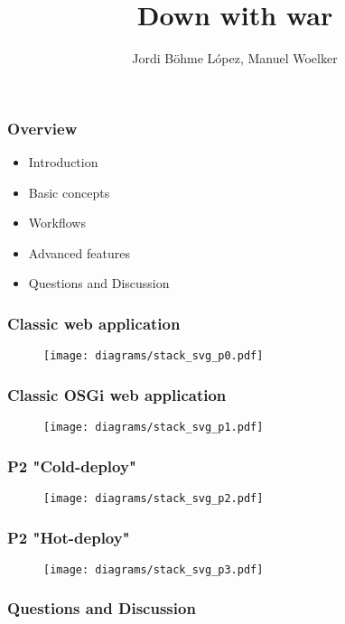 \documentclass{beamer}
\author[Jordi Böhme López]{Jordi Böhme López, Manuel Woelker}
\title[git intro\hspace{2em}\insertframenumber/\inserttotalframenumber]{Down with war}
\begin{document}
\maketitle


\begin{frame}
  \frametitle{Overview}
  \begin{itemize}
  \item Introduction\pause
  \item Basic concepts\pause
  \item Workflows\pause
  \item Advanced features\pause
  \item Questions and Discussion
  \end{itemize}
\end{frame}


\begin{frame}
  \frametitle{Classic web application}
\begin{figure}
   \texttt{[image: diagrams/stack\_svg\_p0.pdf]}
\end{figure}
\end{frame}

\begin{frame}
  \frametitle{Classic OSGi web application}
\begin{figure}
   \texttt{[image: diagrams/stack\_svg\_p1.pdf]}
\end{figure}
\end{frame}

\begin{frame}
  \frametitle{P2 "Cold-deploy"}
\begin{figure}
   \texttt{[image: diagrams/stack\_svg\_p2.pdf]}
\end{figure}
\end{frame}

\begin{frame}
  \frametitle{P2 "Hot-deploy"}
\begin{figure}
   \texttt{[image: diagrams/stack\_svg\_p3.pdf]}
\end{figure}
\end{frame}

\begin{frame}
  \frametitle{Questions and Discussion}
\end{frame}
\end{document}
